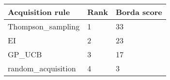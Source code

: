 \begin{tabular}{lll}
Acquisition rule & Rank & Borda score \\ 
\hline 
Thompson_sampling & 1 & 33 \\ 
EI & 2 & 23 \\ 
GP_UCB & 3 & 17 \\ 
random_acquisition & 4 & 3 \\ 
\hline 
\end{tabular}